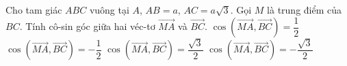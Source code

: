 \begin{ex}%
	Cho tam giác $ABC$ vuông tại $A$, $AB=a$, $AC=a\sqrt{3} $. Gọi $M$ là trung điểm của $BC$. Tính cô-sin góc giữa hai véc-tơ $\overrightarrow {MA}$ và $\overrightarrow {BC}$.
	\choice
	{$\cos \left(\overrightarrow {MA},\overrightarrow {BC}\right)=\dfrac {1}{2}$} 
	{\True $\cos \left(\overrightarrow {MA},\overrightarrow {BC}\right)=-\dfrac {1}{2}$} 
	{$\cos \left(\overrightarrow {MA},\overrightarrow {BC}\right)=\dfrac {\sqrt{3}}{2}$} 
	{$\cos \left(\overrightarrow {MA},\overrightarrow {BC}\right)=-\dfrac {\sqrt{3}}{2}$}
\end{ex}
